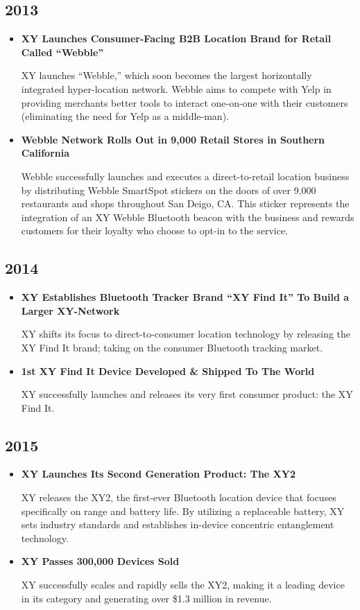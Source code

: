 \documentclass{article}
\begin{document}
\subsection{2013}
\begin{itemize}
\item\textbf{XY Launches Consumer-Facing B2B Location Brand for Retail Called ``Webble''}

XY launches ``Webble,'' which soon becomes the largest horizontally integrated hyper-location network. Webble aims to compete with Yelp in providing merchants better tools to interact one-on-one with their customers (eliminating the need for Yelp as a middle-man).

\item\textbf{Webble Network Rolls Out in 9,000 Retail Stores in Southern California}

Webble successfully launches and executes a direct-to-retail location business by distributing Webble SmartSpot stickers on the doors of over 9,000 restaurants and shops throughout San Deigo, CA. This sticker represents the integration of an XY Webble Bluetooth beacon with the business and rewards customers for their loyalty who choose to opt-in to the service. 
\end{itemize}

\subsection{2014}
\begin{itemize}
\item \textbf{XY Establishes Bluetooth Tracker Brand ``XY Find It'' To Build a Larger XY-Network}

XY shifts its focus to direct-to-consumer location technology by releasing the XY Find It brand; taking on the consumer Bluetooth tracking market.

\item \textbf{1st XY Find It Device Developed \& Shipped To The World}

XY successfully launches and releases its very first consumer product: the XY Find It.
\end{itemize}

\subsection{2015}
\begin{itemize}
\item \textbf{XY Launches Its Second Generation Product: The XY2}

XY releases the XY2, the first-ever Bluetooth location device that focuses specifically on range and battery life. By utilizing a replaceable battery, XY sets industry standards and establishes in-device concentric entanglement technology.

\item \textbf{XY Passes 300,000 Devices Sold}

XY successfully scales and rapidly sells the XY2, making it a leading device in its category and generating over \$1.3 million in revenue.
\end{itemize}
\end{document}
